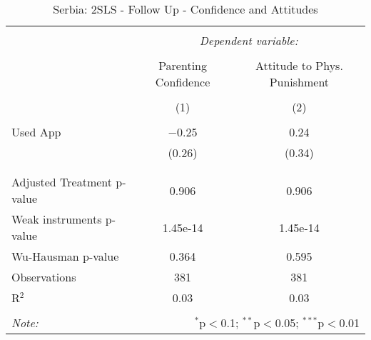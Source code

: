 
\begin{table}[!htbp] \centering 
  \caption{Serbia: 2SLS - Follow Up - Confidence and Attitudes} 
  \label{tbl:Serbia: 2SLS - Follow Up - Confidence and Attitudes} 
\begin{tabular}{@{\extracolsep{5pt}}lcc} 
\\[-1.8ex]\hline 
\hline \\[-1.8ex] 
 & \multicolumn{2}{c}{\textit{Dependent variable:}} \\ 
\cline{2-3} 
\\[-1.8ex] & Parenting Confidence & Attitude to Phys. Punishment \\ 
\\[-1.8ex] & (1) & (2)\\ 
\hline \\[-1.8ex] 
 Used App & $-$0.25 & 0.24 \\ 
  & (0.26) & (0.34) \\ 
  & & \\ 
\hline \\[-1.8ex] 
Adjusted Treatment p-value & 0.906 & 0.906 \\ 
Weak instruments p-value & 1.45e-14 & 1.45e-14 \\ 
Wu-Hausman p-value & 0.364 & 0.595 \\ 
Observations & 381 & 381 \\ 
R$^{2}$ & 0.03 & 0.03 \\ 
\hline 
\hline \\[-1.8ex] 
\textit{Note:}  & \multicolumn{2}{r}{$^{*}$p$<$0.1; $^{**}$p$<$0.05; $^{***}$p$<$0.01} \\ 
\end{tabular} 
\end{table} 
